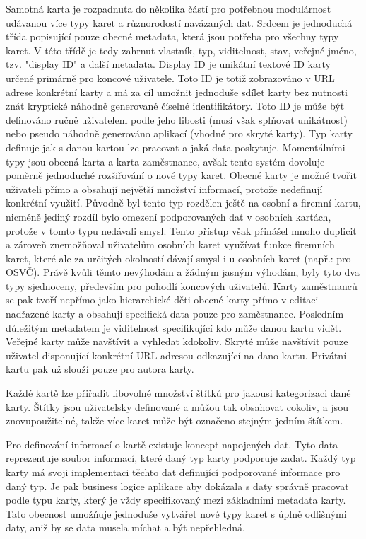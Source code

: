 		Samotná karta je rozpadnuta do několika částí pro potřebnou modulárnost udávanou více typy karet a různorodostí
		navázaných dat.
		Srdcem je jednoduchá třída popisující pouze obecné metadata, která jsou potřeba pro všechny typy karet.
		V této třídě je tedy zahrnut vlastník, typ, viditelnost, stav, veřejné jméno, tzv. "display ID" a další metadata.
		Display ID je unikátní textové ID karty určené primárně pro koncové uživatele.
		Toto ID je totiž zobrazováno v \ac{URL} adrese konkrétní karty a má za cíl umožnit jednoduše sdílet karty bez nutnosti
		znát kryptické náhodně generované číselné identifikátory.
		Toto ID je může být definováno ručně uživatelem podle jeho libosti (musí však splňovat unikátnost) nebo pseudo
		náhodně generováno aplikací (vhodné pro skryté karty).
		Typ karty definuje jak s danou kartou lze pracovat a jaká data poskytuje.
		Momentálními typy jsou obecná karta a karta zaměstnance, avšak tento systém dovoluje poměrně jednoduché rozšiřování
		o nové typy karet.
		Obecné karty je možné tvořit uživateli přímo a obsahují největší množství informací, protože nedefinují konkrétní
		využití.
		Původně byl tento typ rozdělen ještě na osobní a firemní kartu, nicméně jediný rozdíl bylo omezení podporovaných dat
		v osobních kartách, protože v tomto typu nedávali smysl.
		Tento přístup však přinášel mnoho duplicit a zároveň znemožňoval uživatelům osobních karet využívat funkce
		firemních karet, které ale za určitých okolností dávají smysl i u osobních karet (např.: pro OSVČ).
		Právě kvůli těmto nevýhodám a žádným jasným výhodám, byly tyto dva typy sjednoceny, především pro pohodlí
		koncových uživatelů.
		Karty zaměstnanců se pak tvoří nepřímo jako hierarchické děti obecné karty přímo v editaci nadřazené karty a
		obsahují specifická data pouze pro zaměstnance.
		Posledním důležitým metadatem je viditelnost specifikující kdo může danou kartu vidět.
		Veřejné karty může navštívit a vyhledat kdokoliv.
		Skryté může navštívit pouze uživatel disponující konkrétní \ac{URL} adresou odkazující na dano kartu.
		Privátní kartu pak už slouží pouze pro autora karty.

		Každé kartě lze přiřadit libovolné množství štítků pro jakousi kategorizaci dané karty.
		Štítky jsou uživatelsky definované a můžou tak obsahovat cokoliv, a jsou znovupoužitelné, takže více karet může
		být označeno stejným jedním štítkem.

		Pro definování informací o kartě existuje koncept napojených dat.
		Tyto data reprezentuje soubor informací, které daný typ karty podporuje zadat.
		Každý typ karty má svoji implementaci těchto dat definující podporované informace pro daný typ.
		Je pak business logice aplikace aby dokázala s daty správně pracovat podle typu karty, který je vždy specifikovaný mezi
		základními metadata karty.
		Tato obecnost umožňuje jednoduše vytvářet nové typy karet s úplně odlišnými daty, aniž by se data musela míchat
		a být nepřehledná.

